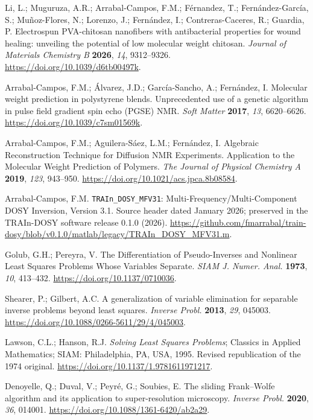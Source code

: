 Li, L.; Muguruza, A.R.; Arrabal-Campos, F.M.; Férnandez, T.; Fernández-García, S.; Muñoz-Flores, N.; Lorenzo, J.; Fernández, I.; Contreras-Caceres, R.; Guardia, P. Electrospun PVA-chitosan nanofibers with antibacterial properties for wound healing: unveiling the potential of low molecular weight chitosan. \emph{Journal of Materials Chemistry B} \textbf{2026}, \emph{14}, 9312--9326. \url{https://doi.org/10.1039/d6tb00497k}.

Arrabal-Campos, F.M.; Álvarez, J.D.; García-Sancho, A.; Fernández, I. Molecular weight prediction in polystyrene blends. Unprecedented use of a genetic algorithm in pulse field gradient spin echo (PGSE) NMR. \emph{Soft Matter} \textbf{2017}, \emph{13}, 6620--6626. \url{https://doi.org/10.1039/c7sm01569k}.

Arrabal-Campos, F.M.; Aguilera-Sáez, L.M.; Fernández, I. Algebraic Reconstruction Technique for Diffusion NMR Experiments. Application to the Molecular Weight Prediction of Polymers. \emph{The Journal of Physical Chemistry A} \textbf{2019}, \emph{123}, 943--950. \url{https://doi.org/10.1021/acs.jpca.8b08584}.

Arrabal-Campos, F.M. \texttt{TRAIn\_DOSY\_MFV31}: Multi-Frequency/Multi-Component DOSY Inversion, Version 3.1. Source header dated January 2026; preserved in the TRAIn-DOSY software release 0.1.0 (2026). \url{https://github.com/fmarrabal/train-dosy/blob/v0.1.0/matlab/legacy/TRAIn_DOSY_MFV31.m}.

Golub, G.H.; Pereyra, V. The Differentiation of Pseudo-Inverses and Nonlinear Least Squares Problems Whose Variables Separate. \emph{SIAM J. Numer. Anal.} \textbf{1973}, \emph{10}, 413--432. \url{https://doi.org/10.1137/0710036}.

Shearer, P.; Gilbert, A.C. A generalization of variable elimination for separable inverse problems beyond least squares. \emph{Inverse Probl.} \textbf{2013}, \emph{29}, 045003. \url{https://doi.org/10.1088/0266-5611/29/4/045003}.

Lawson, C.L.; Hanson, R.J. \emph{Solving Least Squares Problems}; Classics in Applied Mathematics; SIAM: Philadelphia, PA, USA, 1995. Revised republication of the 1974 original. \url{https://doi.org/10.1137/1.9781611971217}.

Denoyelle, Q.; Duval, V.; Peyr\'e, G.; Soubies, E. The sliding Frank--Wolfe algorithm and its application to super-resolution microscopy. \emph{Inverse Probl.} \textbf{2020}, \emph{36}, 014001. \url{https://doi.org/10.1088/1361-6420/ab2a29}.

